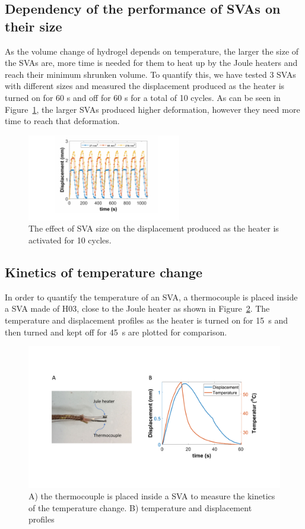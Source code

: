 \subsection{Dependency of the performance of SVAs on their size}
As the volume change of hydrogel depends on temperature, the larger the size of the SVAs are, more time is needed for them to heat up by the Joule heaters and reach their minimum shrunken volume. To quantify this, we have tested 3 SVAs with different sizes and measured the displacement produced as the heater is turned on for 60 s and off for 60 s for a total of 10 cycles. As can be seen in Figure~\ref{fig:svaSize}, the larger SVAs produced higher deformation, however they need more time to reach that deformation. 
\begin{figure}[!htb]
      \centering
      \includegraphics[width=0.6\textwidth]{svaSize.pdf}
      \caption{The effect of SVA size on the displacement produced as the heater is activated for 10 cycles.}
      \label{fig:svaSize}
\end{figure}

\subsection{Kinetics of temperature change} 
In order to quantify the temperature of an SVA, a thermocouple is placed inside a SVA made of H03, close to the Joule heater as shown in Figure~\ref{fig:tempKinetics}. The temperature and displacement profiles as the heater is turned on for 15~s and then turned and kept off for 45~s are plotted for comparison.

\begin{figure}[!htb]
\centering
\includegraphics[width=\textwidth]{tempKinetics.pdf}
    \caption{A) the thermocouple is placed inside a SVA to measure the kinetics of the temperature change. B) temperature and displacement profiles }
    \label{fig:tempKinetics}
\end{figure}

